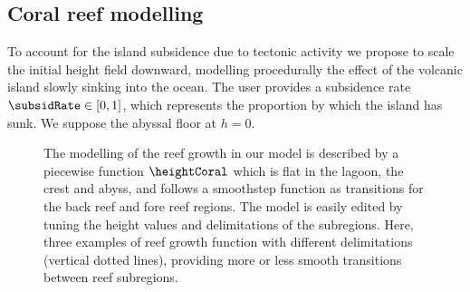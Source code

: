 \subsection{Coral reef modelling}
\label{sec:coral-island-coral-reef}



To account for the island subsidence due to tectonic activity we propose to scale the initial height field downward, modelling procedurally the effect of the volcanic island slowly sinking into the ocean. The user provides a subsidence rate $\subsidRate \in [0, 1]$, which represents the proportion by which the island has sunk. We suppose the abyssal floor at $h=0$.





\begin{figure}[tb]
    \caption[Coral reef growth from analytical model]{The modelling of the reef growth in our model is described by a piecewise function $\heightCoral$ which is flat in the lagoon, the crest and abyss, and follows a smoothstep function as transitions for the back reef and fore reef regions. The model is easily edited by tuning the height values and delimitations of the subregions. Here, three examples of reef growth function with different delimitations (vertical dotted lines), providing more or less smooth transitions between reef subregions.}
    \label{fig:coral-island-reef-function}
\end{figure}

